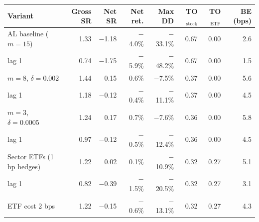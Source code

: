 \begin{tabular}{@{}lrrrrrrr@{}}
\toprule
Variant & Gross SR & Net SR & Net ret. & Max DD & TO$_{\text{stock}}$ & TO$_{\text{ETF}}$ & BE (bps)\\
\midrule
AL baseline ($m=15$) & 1.33 & \ensuremath{-}1.18 & \ensuremath{-}4.0\% & \ensuremath{-}33.1\% & 0.67 & 0.00 & 2.6\\
\quad lag 1 & 0.74 & \ensuremath{-}1.75 & \ensuremath{-}5.9\% & \ensuremath{-}48.2\% & 0.67 & 0.00 & 1.5\\
\midrule
$m=8$, $\delta=0.002$ & 1.44 & 0.15 & 0.6\% & \ensuremath{-}7.5\% & 0.37 & 0.00 & 5.6\\
\quad lag 1 & 1.18 & \ensuremath{-}0.12 & \ensuremath{-}0.4\% & \ensuremath{-}11.1\% & 0.37 & 0.00 & 4.5\\
\midrule
$m=3$, $\delta=0.0005$ & 1.24 & 0.17 & 0.7\% & \ensuremath{-}7.6\% & 0.36 & 0.00 & 5.8\\
\quad lag 1 & 0.97 & \ensuremath{-}0.12 & \ensuremath{-}0.5\% & \ensuremath{-}12.4\% & 0.36 & 0.00 & 4.5\\
\midrule
Sector ETFs (1 bp hedges) & 1.22 & 0.02 & 0.1\% & \ensuremath{-}10.9\% & 0.32 & 0.27 & 5.1\\
\quad lag 1 & 0.82 & \ensuremath{-}0.39 & \ensuremath{-}1.5\% & \ensuremath{-}20.5\% & 0.32 & 0.27 & 3.1\\
\quad ETF cost 2 bps & 1.22 & \ensuremath{-}0.15 & \ensuremath{-}0.6\% & \ensuremath{-}13.1\% & 0.32 & 0.27 & 4.3\\
\bottomrule
\end{tabular}
